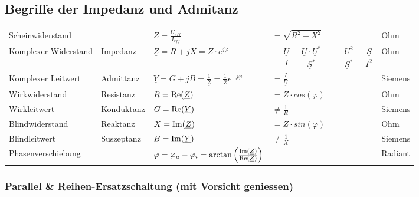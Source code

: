 	\subsection{Begriffe der Impedanz und Admitanz}
		\begin{tabular}{lllll}
		Scheinwiderstand & & $Z = \frac{U_{eff}}{I_{eff}} $ & $ =
		\sqrt{R^2+X^2}$ & Ohm\\ Komplexer Widerstand & Impedanz & $\underline Z = R + jX = Z \cdot e^{j \varphi}$ 
		& $  = \dfrac{\underline{U}}{\underline{I}} = \dfrac{\underline{U}\cdot\underline{U}^{\ast}}{\underline{S}^*} =  = \dfrac{U^2}{\underline{S}^*} = 
		\dfrac{\underline{S}}{I^2}$ & Ohm\\
		Komplexer Leitwert & Admittanz & $\underline Y = G + jB =
		\frac{1}{\underline Z} = \frac{1}{Z}e^{-j\varphi}$ & $= \frac{\underline{I}}{\underline{U}}$ &  Siemens\\
		Wirkwiderstand & Resistanz & $R = \operatorname{Re}(\underline Z) $ & $ = Z
		\cdot cos(\varphi)$ & Ohm\\
		Wirkleitwert & Konduktanz & $G = \operatorname{Re}(\underline Y) $ & $ \neq \frac{1}{R}$ &
		Siemens\\
		Blindwiderstand & Reaktanz & $X = \operatorname{Im}(\underline Z) $ & $ = Z
		\cdot sin(\varphi)$ & Ohm\\
		Blindleitwert & Suszeptanz & $B = \operatorname{Im}( \underline Y) $ & $ \neq \frac{1}{X}$
		& Siemens\\
		Phasenverschiebung & & $\varphi = \varphi_u - \varphi_i =
		\arctan\left(\frac{\operatorname{Im}(\underline{Z})}{\operatorname{Re}(\underline{Z})}\right)$ & &
		Radiant\\
		
		\end{tabular}
	
	\subsubsection{Parallel \& Reihen-Ersatzschaltung (mit Vorsicht geniessen)}
	
		
